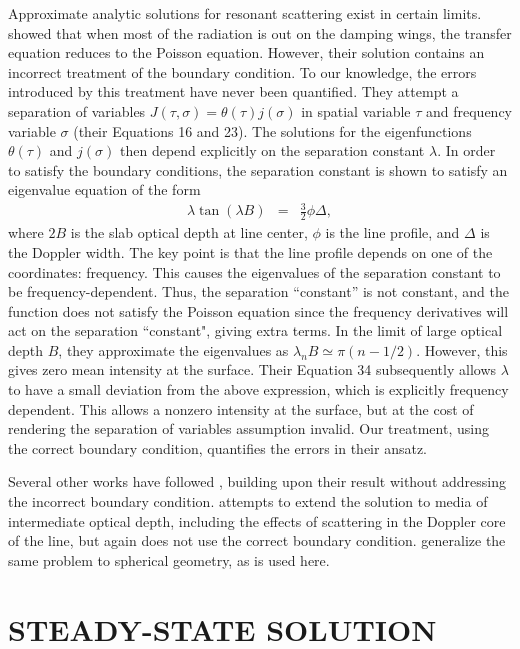 \documentclass{aastex63}
\newcommand{\be}{\begin{eqnarray}}
\newcommand{\ee}{\end{eqnarray}}
\begin{document}
Approximate analytic solutions for resonant scattering exist in certain limits. \citet{1973MNRAS.162...43H} showed that when most of the radiation is out on the damping wings, the transfer equation reduces to the Poisson equation. However, their solution contains an incorrect treatment of the boundary condition. To our knowledge, the errors introduced by this treatment have never been quantified. They attempt a separation of variables $J(\tau,\sigma) = \theta(\tau) j(\sigma)$ in spatial variable $\tau$ and frequency variable $\sigma$ (their Equations 16 and 23). The solutions for the eigenfunctions $\theta(\tau)$ and $j(\sigma)$ then depend explicitly on the separation constant $\lambda$. In order to satisfy the boundary conditions, the separation constant is shown to satisfy an eigenvalue equation of the form
\be
\lambda \tan(\lambda B) & = & \frac{3}{2} \phi \Delta,
\label{eq:evalue}
\ee
where $2B$ is the slab optical depth at line center, $\phi$ is the line profile, and $\Delta$ is the Doppler width. The key point is that the line profile depends on one of the coordinates: frequency. This causes the eigenvalues of the separation constant to be frequency-dependent. Thus, the separation ``constant'' is not constant, and the function does not satisfy the Poisson equation since the frequency derivatives will act on the separation ``constant", giving extra terms. In the limit of large optical depth $B$, they approximate the eigenvalues as $\lambda_n B \simeq \pi (n-1/2)$. However, this gives zero mean intensity at the surface. Their Equation 34 subsequently allows $\lambda$ to have a small deviation from the above expression, which is explicitly frequency dependent. This allows a nonzero intensity at the surface, but at the cost of rendering the separation of variables assumption invalid. Our treatment, using the correct boundary condition, quantifies the errors in their ansatz.

Several other works have followed \citet{1973MNRAS.162...43H}, building upon their result without addressing the incorrect boundary condition. \citet{1990ApJ...350..216N} attempts to extend the solution to media of intermediate optical depth, including the effects of scattering in the Doppler core of the line, but again does not use the correct boundary condition. \citet{2006ApJ...649...14D} generalize the same problem to spherical geometry, as is used here.

\section{STEADY-STATE SOLUTION}
\label{sec:steadystate}
\end{document}
